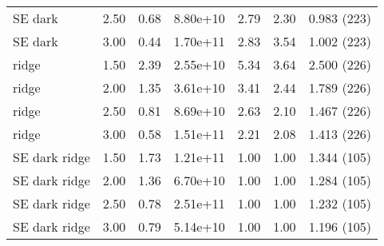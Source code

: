 \documentclass[preprint2,tighten,trackchanges]{aastex6}
\begin{document}
\begin{table*}
\begin{tabular}{@{}lrrrrrr@{}}
        SE dark & 2.50 & 0.68 & 8.80e+10 & 2.79 & 2.30 & 0.983 (223) \\  %
        SE dark & 3.00 & 0.44 & 1.70e+11 & 2.83 & 3.54 & 1.002 (223) \\  %
        \midrule
        ridge & 1.50 & 2.39 & 2.55e+10 & 5.34 & 3.64 & 2.500 (226) \\  %
        ridge & 2.00 & 1.35 & 3.61e+10 & 3.41 & 2.44 & 1.789 (226) \\  %
        ridge & 2.50 & 0.81 & 8.69e+10 & 2.63 & 2.10 & 1.467 (226) \\  %
        ridge & 3.00 & 0.58 & 1.51e+11 & 2.21 & 2.08 & 1.413 (226) \\  %
        \midrule
        SE dark ridge & 1.50 & 1.73 & 1.21e+11 & 1.00 & 1.00 & 1.344 (105) \\  %
        SE dark ridge & 2.00 & 1.36 & 6.70e+10 & 1.00 & 1.00 & 1.284 (105) \\  %
        SE dark ridge & 2.50 & 0.78 & 2.51e+11 & 1.00 & 1.00 & 1.232 (105) \\  %
        SE dark ridge & 3.00 & 0.79 & 5.14e+10 & 1.00 & 1.00 & 1.196 (105) \\  %
        \bottomrule
    \end{tabular}
\end{table*}
\end{document}
